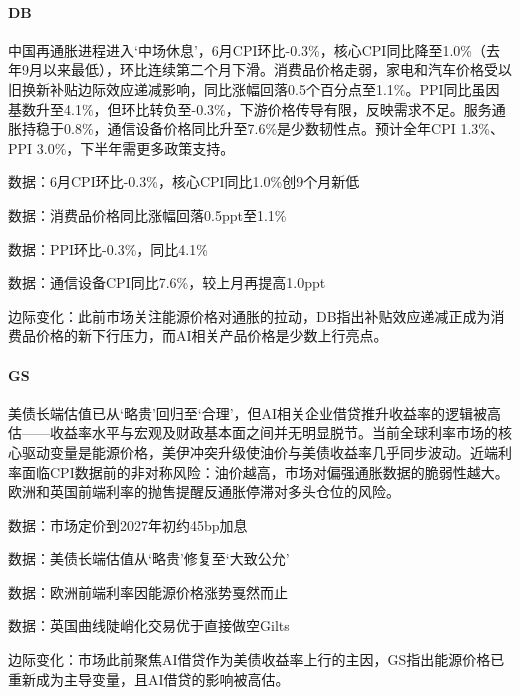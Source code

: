 \documentclass[11pt]{ctexart}
\begin{document}
\paragraph{DB} 中国再通胀进程进入‘中场休息’，6月CPI环比-0.3\%，核心CPI同比降至1.0\%（去年9月以来最低），环比连续第二个月下滑。消费品价格走弱，家电和汽车价格受以旧换新补贴边际效应递减影响，同比涨幅回落0.5个百分点至1.1\%。PPI同比虽因基数升至4.1\%，但环比转负至-0.3\%，下游价格传导有限，反映需求不足。服务通胀持稳于0.8\%，通信设备价格同比升至7.6\%是少数韧性点。预计全年CPI 1.3\%、PPI 3.0\%，下半年需更多政策支持。
{\small\color{refgray}数据：6月CPI环比-0.3\%，核心CPI同比1.0\%创9个月新低\par}
{\small\color{refgray}数据：消费品价格同比涨幅回落0.5ppt至1.1\%\par}
{\small\color{refgray}数据：PPI环比-0.3\%，同比4.1\%\par}
{\small\color{refgray}数据：通信设备CPI同比7.6\%，较上月再提高1.0ppt\par}
{\small\color{refgray}边际变化：此前市场关注能源价格对通胀的拉动，DB指出补贴效应递减正成为消费品价格的新下行压力，而AI相关产品价格是少数上行亮点。\par}
\paragraph{GS} 美债长端估值已从‘略贵’回归至‘合理’，但AI相关企业借贷推升收益率的逻辑被高估——收益率水平与宏观及财政基本面之间并无明显脱节。当前全球利率市场的核心驱动变量是能源价格，美伊冲突升级使油价与美债收益率几乎同步波动。近端利率面临CPI数据前的非对称风险：油价越高，市场对偏强通胀数据的脆弱性越大。欧洲和英国前端利率的抛售提醒反通胀停滞对多头仓位的风险。
{\small\color{refgray}数据：市场定价到2027年初约45bp加息\par}
{\small\color{refgray}数据：美债长端估值从‘略贵’修复至‘大致公允’\par}
{\small\color{refgray}数据：欧洲前端利率因能源价格涨势戛然而止\par}
{\small\color{refgray}数据：英国曲线陡峭化交易优于直接做空Gilts\par}
{\small\color{refgray}边际变化：市场此前聚焦AI借贷作为美债收益率上行的主因，GS指出能源价格已重新成为主导变量，且AI借贷的影响被高估。\par}
\end{document}
